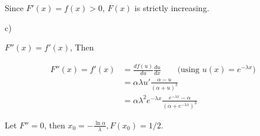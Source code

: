 \documentclass[letterpaper, 11pt]{article}
\newcommand{\1}{\mathds{1}}	%
\theoremstyle{definition}
\begin{document}
Since $  F'(x) = f(x) >0$, $F(x)$ is strictly increasing.

c)

$F''(x) = f'(x)$, Then

\begin{align*}
  F''(x) = f'(x) &= \frac{df(u)}{du} \frac{du}{dx} \qquad \text{(using $u(x) = e ^{-\lambda x}$)} \\
  &= \alpha \lambda u' \frac{\alpha - u}{(\alpha + u)^{3}} \\
  &= \alpha \lambda ^{2} e ^{- \lambda x} \frac{e ^{- \lambda x} - \alpha}{(\alpha + e ^{- \lambda x})^{3}}
\end{align*}

Let $F'' = 0$, then $x_{0} = -\frac{\ln \alpha}{\lambda}, F(x_{0}) = 1/2$.


\end{document}
